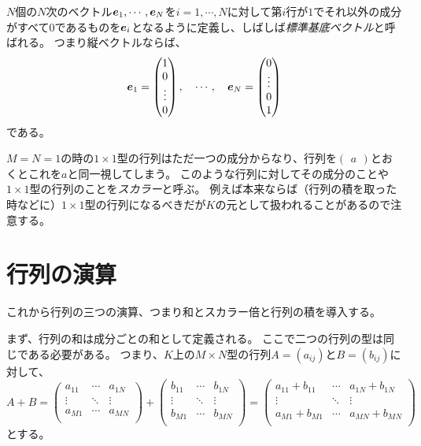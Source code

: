$N$個の$N$次のベクトル$\vb*{e}_1, \cdots, \vb*{e}_N$を$i = 1, \cdots, N$に対して第$i$行が$1$でそれ以外の成分がすべて$0$であるものを$\vb*{e}_i$となるように定義し、しばしば\emph{標準基底ベクトル}と呼ばれる。
つまり縦ベクトルならば、
$$
\vb*{e}_1 = \begin{pmatrix}1 \\ 0 \\ \vdots \\ 0\end{pmatrix},
\quad \cdots,
\quad \vb*{e}_N = \begin{pmatrix}0 \\ \vdots \\ 0 \\ 1\end{pmatrix}
$$
である。

$M = N = 1$の時の$1\times 1$型の行列はただ一つの成分からなり、行列を$\begin{pmatrix}a\end{pmatrix}$とおくとこれを$a$と同一視してしまう。
このような行列に対してその成分のことや$1\times 1$型の行列のことを\emph{スカラー}と呼ぶ。
例えば本来ならば（行列の積を取った時などに）$1\times 1$型の行列になるべきだが$K$の元として扱われることがあるので注意する。

\section{行列の演算}

これから行列の三つの演算、つまり和とスカラー倍と行列の積を導入する。

まず、行列の和は成分ごとの和として定義される。
ここで二つの行列の型は同じである必要がある。
つまり、$K$上の$M\times N$型の行列$A = (a_{i j})$と$B = (b_{i j})$に対して、
$$
A+B =
\begin{pmatrix}
a_{1 1} & \cdots & a_{1 N} \\
\vdots & \ddots & \vdots \\
a_{M 1} & \cdots & a_{M N} \\
\end{pmatrix}
+
\begin{pmatrix}
b_{1 1} & \cdots & b_{1 N} \\
\vdots & \ddots & \vdots \\
b_{M 1} & \cdots & b_{M N} \\
\end{pmatrix}
=
\begin{pmatrix}
a_{1 1}+b_{1 1} & \cdots & a_{1 N}+b_{1 N} \\
\vdots & \ddots & \vdots \\
a_{M 1}+b_{M 1} & \cdots & a_{M N}+b_{M N} \\
\end{pmatrix}
$$
とする。

